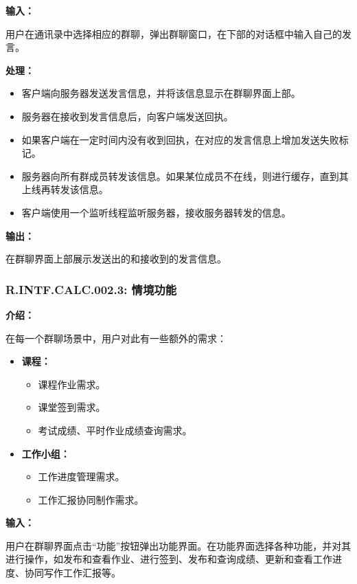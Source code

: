 \textbf{输入：}

用户在通讯录中选择相应的群聊，弹出群聊窗口，在下部的对话框中输入自己的发言。

\textbf{处理：}

\begin{itemize}
  \item 客户端向服务器发送发言信息，并将该信息显示在群聊界面上部。
  \item 服务器在接收到发言信息后，向客户端发送回执。
  \item 如果客户端在一定时间内没有收到回执，在对应的发言信息上增加发送失败标记。
  \item 服务器向所有群成员转发该信息。如果某位成员不在线，则进行缓存，直到其上线再转发该信息。
  \item 客户端使用一个监听线程监听服务器，接收服务器转发的信息。
\end{itemize}

\textbf{输出：}

在群聊界面上部展示发送出的和接收到的发言信息。

\subsubsection{R.INTF.CALC.002.3: 情境功能}
\textbf{介绍：}

在每一个群聊场景中，用户对此有一些额外的需求：

\begin{itemize}
  \item \textbf{课程：}
        \begin{itemize}
        \item 课程作业需求。
        \item 课堂签到需求。
        \item 考试成绩、平时作业成绩查询需求。
        \end{itemize}
  \item \textbf{工作小组：}
        \begin{itemize}
        \item 工作进度管理需求。
        \item 工作汇报协同制作需求。
        \end{itemize}
\end{itemize}

\textbf{输入：}

用户在群聊界面点击“功能”按钮弹出功能界面。在功能界面选择各种功能，并对其进行操作，如发布和查看作业、进行签到、发布和查询成绩、更新和查看工作进度、协同写作工作汇报等。

